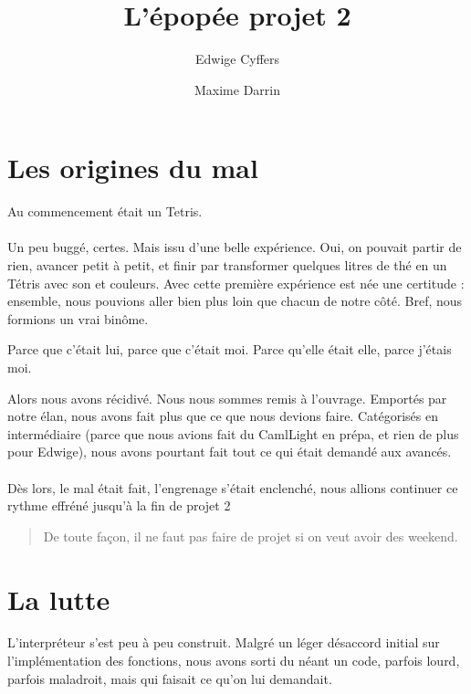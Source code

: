 \documentclass{article}
\title{L'épopée projet 2}
\author{Edwige Cyffers \and Maxime Darrin}
\date{}
\begin{document}
\maketitle
\tableofcontents

\newpage

\section{Les origines du mal}

	Au commencement était un Tetris.
	
	\paragraph{}
	Un peu buggé, certes. Mais issu d'une belle expérience. Oui, on pouvait partir de rien, avancer petit à petit, et finir par transformer quelques litres de thé en un Tétris avec son et couleurs. Avec cette première expérience est née une certitude : ensemble, nous pouvions aller bien plus loin que chacun de notre côté. Bref, nous formions un vrai binôme.
	
	Parce que c'était lui, parce que c'était moi.		
	Parce qu'elle était elle, parce j'étais moi.
	
	Alors nous avons récidivé. Nous nous sommes remis à l'ouvrage. Emportés par notre élan, nous avons fait plus que ce que nous devions faire. Catégorisés en intermédiaire (parce que nous avions fait du CamlLight en prépa, et rien de plus pour Edwige), nous avons pourtant fait tout ce qui était demandé aux avancés.	
	
	\paragraph{}
	Dès lors, le mal était fait, l'engrenage s'était enclenché, nous allions continuer ce rythme effréné jusqu'à la fin de projet 2
	
	\begin{quotation}
		De toute façon, il ne faut pas faire de projet si on veut avoir des weekend.
	\end{quotation}
	

\section{La lutte}

	
	L'interpréteur s'est peu à peu construit. Malgré un léger désaccord initial sur l'implémentation des fonctions, nous avons sorti du néant un code, parfois lourd, parfois maladroit, mais qui faisait ce qu'on lui demandait.
	
\end{document}
